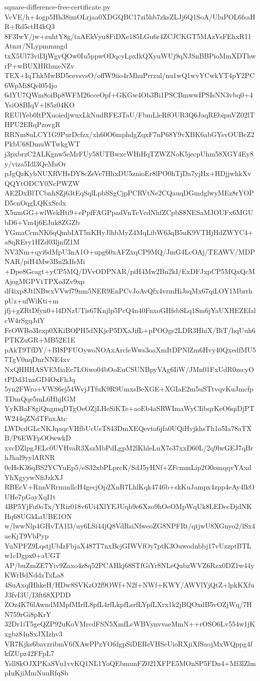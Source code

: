 \documentclass[11pt]{article}
\theoremstyle{definition}
\theoremstyle{remark}
\begin{document}
\begin{filecontents*}[overwrite]{square-difference-free-certificate.py}
VcVE/h+4ogp5Hh38imOLrjaa0XDGQBC17zi5hb7zksZLJj6Q1SoA/UluPOL6fsaHR+Rd5ctH4kQ3
8F3IwY/jw+zuhtY8g/taAEkVyu8FiDXe185LGu6r4ZCJCKGT5MAzVsFEhxR11Atnzr/NLypmmmgd
txX5Ul73viI3jWgvQOw0Iu5ppwODqcyLpxIkQXyuWUj9qNJSnBBPioMmXDThwrP+wBUXHRhmeNZv
TEX+IqThkMwBD5cevsvsO/offW9iio4rMhuPrrzul/nu1wQ1wvYCwkYT4pY2PC6WpMi8Qel054jo
6dYU7QWm8oiBp8WFM26cceOpf+GKGw4Ob3Bi1PSCBmwwIPSIsNN3vbq0+4YsiO8BIqV+l85z04KO
REUlYeb0ltPXuoiedjwuxLkNudRFE3TaU/FbmLleRfOUR3Q6JaqREbipnVZ02lTHPU2ERqPzovgR
RRNm8uLCY1G9PurDcfzx/xh60O6mphdgZqxF7nP68Y9vXBK6abGYsvOUBcZ2PkbU68DmuWTwkgWT
j3pxbrzC2ALKgnw5eMrFUy58UTBwxcWHiHqTZWZNoK5jecpUhm58XGY4Ey8y/viza5Idl3QeMuOr
pJgQzKybNUXRVHsDY8cZeVc7HhxDU5znioEr8lPO0hTjDa7yjHx+HDjjwhkXvQQYtODCY0NcPWZW
AE2DxBlTCbnh8Zj63tEqSqlLpbSSgCjpPCRVtNe2CQauqDGmdglwyMEz8rYOPD5cnOqgLQKxSrdx
X5umGG+wlWekHti9+ePpfFAGPpadVnTcVcdNhfZCpbS8NESaMJOUFx6MGUbD6+Vm4j6EJuk8ZGZb
YGmaCcmNK6qQmbIAT5nKHyJlhbMyZ4MqLibW63qB5uK9VTHjHdZWYC4+a8qREry1HZd03ljnfZ1M
NV3Nm+qyi6dMpU3nA1O+upg60xAFZxqCP9MQ/JmG4LcOAj/TEAWV/MDPNAR/piH4Mw3Bn2kIfsMi
+Dpe8Gcagt+yCP5MQ/DVvODPNAR/piH4Mw2Bn2kI/ExDFJxpCP5MQxQcMAjogMGPVtTPXo3Zv9xp
df4ixp8JtlNBwxVVwf79nm5NER9EnPCvJoAvQfx4vrmHiJsqMx67qiLOY1MbrrhpUz+ufWiKti+m
jfj+gZRtDfyn0+l4DNzUTis67Knjlp5PcQ4n40FnxoGHfsbSLq1Sm6jYaUXHEZEfalcW4rSgqJdY
FeOWBo3Iexp0XKiBOPH5dNKjeP5DXaJifL+pPOOgs2LDR3HhiX/BiT/hqUuh6PTKZuGR+MB52E1E
pAkT9TfDY/+BI8PFUOywoNOAxArcleWws3oaXmItDPNlZm6Hvy40QxedfMU57TgV0nqDnrNNE4xv
NxQHHHASVEMiaEc7LOiwo04bOoEuCSUNBpyVAg6IiW/JMn01FxUdR0zscyOtPDd31nnGD4OxFhJq
5yn2FWro+VWS6ej54WvjJTfuK9R9UmxsBeXGE+XGIaE2m5uSTtvqvKuJmcfpTDmQqe5mL6HhjIGM
YyKBaF8giQngmqDTgOeOZjLHeSiKTe+aoEb4aSRWImaWyCIibqrKeO6qiDjPTW244qZNdTFnxAtc
LWDcdGLcNKJqaqcVHfbUcUsT843DmXEQevta6jfa0UQiHvjkhsTh1o5Ia78aTXB/P6EWFpOOwwkD
xvcDZlpgJELc0UVHvaR3XszMbPdLgpM2lKhleLuX7e37xxD60L/2q9lwGEJ7qBrhJhal9yylARNR
0eHsK36qBS2YCYuEp5/eS32xbPLprcK/SdJ5yHNf+ZFcmmLip2O0omqqvYAxdYhXgyywNfiJzkXJ
RBEcV+RnnVRrmmllcH4gecjOp2XnR7LhlKqk4746b+skKuJampx4zpp4eAy4lkOUHe7pGayXqI1t
4BP5YjFu0oTx/YRiz018v6Ui4XlYEJUqb9e6Xzo9hOeOMpWqUk8LEDecDjdNKHq68UGkLaUBE1ON
w/lwwNlp4GHvTA1l3/uy6LSi44jQ8VdRsiNfweoZG8NPFRt/qtjwU8XGnyo2/lSx4aeKjT9VbPyp
YuNPFZ9LqstjUbIzFbjaX487T7nxBcjGIWVfOy7ptK3Ouwodnbbj17vUzzptBTLw1cDgpx0+aUGT
AP/buZmZE7Yiv9Zaxo4z8q52PCAHkj68STfGiYr8NLeQubzWVZ6Rzx0DZ1w44yKWrBdNddzTxLa8
4SuAxqfHhkeH/HDw8SVKzO2f9OWf+N2f+NWf+KWY/AWVlYjQtZ+lpkKXfuJ3fvI3U/I3ft68XPDD
ZOz4K76lAwndMMpfMIrfL8pfL4rfLkpfLsrfLYpfLXrx1k2jBQOxdB5vOZjWq/7HN759rGi8pKrY
32Dr1iT5geQZP92uKoVMrcdFSN5XmfLcWBVynvvaeMmN++rOSO6Lv554w1jKxgbz84nSxJXIzhv3
VR7Kjks6bavzribmV6fXAwPPzYOfdgpSiDEReVHSeUioRXjiXfSaojMxWQppg4fkfZUpz42FFpL7
Ysll8kOJXPKaSVu1vvKQ1NL1YoQEbmunFZ021XFPE5MOnSP5FDn4+Mf3lZlmpIuKjiMmNuuRfqSb

\end{filecontents*}
\end{document}
